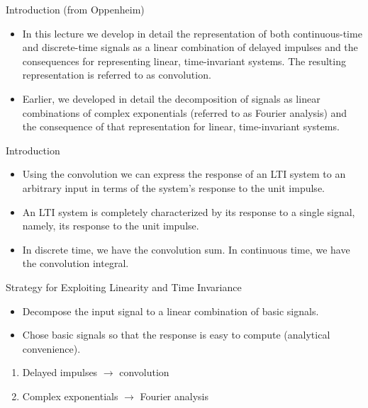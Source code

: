\begin{frame}{Introduction (from Oppenheim)}
    \begin{itemize}
        \item In this lecture we develop in detail the representation of both continuous-time and discrete-time signals as a linear combination of delayed impulses and the consequences for representing linear, time-invariant systems. The resulting representation is referred to as convolution.
        \item Earlier, we developed in detail the decomposition of signals as linear combinations of complex exponentials (referred to as Fourier analysis) and the consequence of that representation for linear, time-invariant systems.
    \end{itemize}
\end{frame}

\begin{frame}{Introduction}
    \begin{itemize}
        \item Using the convolution we can express the response of an LTI system to an arbitrary input in terms of the system's response to the unit impulse.
        \item An LTI system is completely characterized by its response to a single signal, namely, its response to the unit impulse.
        \item In discrete time, we have the convolution sum. In continuous time, we have the convolution integral.
    \end{itemize}
\end{frame}

\begin{frame}{Strategy for Exploiting Linearity and Time Invariance}
    {
    \begin{itemize}
        \item Decompose the input signal to a linear combination of basic signals.
        \item   Chose basic signals so that the response is easy to compute (analytical convenience).
    \end{itemize}

    \begin{enumerate}
        \item Delayed impulses $\rightarrow$ convolution
        \item Complex exponentials $\rightarrow$ Fourier analysis
    \end{enumerate}
    }
\end{frame}


